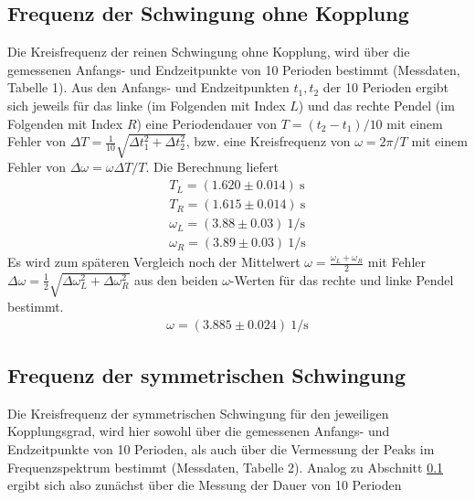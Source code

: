 \documentclass[12pt,a4paper,german]{scrartcl}
\numberwithin{equation}{section}
\begin{document}
  \subsection{Frequenz der Schwingung ohne Kopplung}
  \label{sec_no_coupling}
  Die Kreisfrequenz der reinen Schwingung ohne Kopplung, wird über die gemessenen Anfangs- und Endzeitpunkte von 10 Perioden bestimmt (Messdaten, Tabelle 1).
  Aus den Anfangs- und Endzeitpunkten $t_1, t_2$ der 10 Perioden ergibt sich jeweils für das linke (im Folgenden mit Index $L$) und das rechte Pendel (im Folgenden mit Index $R$) eine Periodendauer von $T = (t_2 - t_1) / 10$ mit einem Fehler von $\Delta T = \frac{1}{10} \sqrt{\Delta t_1^2 + \Delta t_2^2}$, bzw. eine Kreisfrequenz von $\omega = 2 \pi / T$ mit einem Fehler von $\Delta\omega = \omega \Delta T / T$.
  Die Berechnung liefert
  \begin{align}
    T_L = (1.620 \pm 0.014) \ \text{s} \nonumber \\
    T_R = (1.615 \pm 0.014) \ \text{s} \nonumber \\
    \omega_L = (3.88 \pm 0.03) \ 1/\text{s} \nonumber \\
    \omega_R = (3.89 \pm 0.03) \ 1/\text{s}
    \label{eq_nc_T_omega}
  \end{align}
  Es wird zum späteren Vergleich noch der Mittelwert $\omega = \frac{\omega_L + \omega_R}{2}$ mit Fehler $\Delta \omega = \frac{1}{2} \sqrt{\Delta\omega_L^2 + \Delta\omega_R^2}$ aus den beiden $\omega$-Werten für das rechte und linke Pendel bestimmt.
  \begin{align}
    \omega = (3.885 \pm 0.024) \ 1/\text{s}
    \label{eq_nc_omega}
  \end{align}

  \subsection{Frequenz der symmetrischen Schwingung}
  \label{sec_symmetric}
  Die Kreisfrequenz der symmetrischen Schwingung für den jeweiligen Kopplungsgrad, wird hier sowohl über die gemessenen Anfangs- und Endzeitpunkte von 10 Perioden, als auch über die Vermessung der Peaks im Frequenzspektrum bestimmt (Messdaten, Tabelle 2).
  Analog zu Abschnitt \ref{sec_no_coupling} ergibt sich also zunächst über die Messung der Dauer von 10 Perioden
  
\end{document}
